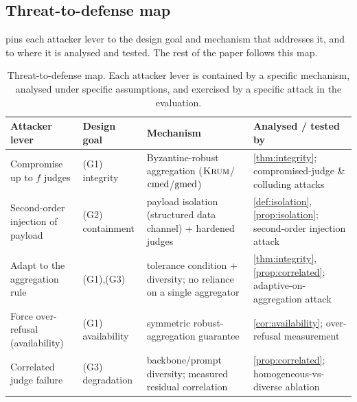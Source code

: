 \subsection{Threat-to-defense map}
 pins each attacker lever to the design goal and mechanism that
addresses it, and to where it is analysed and tested. The rest of the paper follows this
map.

\begin{table}[t]
\centering
\caption{Threat-to-defense map. Each attacker lever is contained by a specific mechanism,
analysed under specific assumptions, and exercised by a specific attack in the evaluation.}
\label{tab:threatmap}
\small
\begin{tabular}{@{}p{3.0cm}p{2.6cm}p{3.1cm}p{3.4cm}@{}}
\toprule
Attacker lever & Design goal & Mechanism & Analysed / tested by \\
\midrule
Compromise up to $f$ judges & (G1) integrity & Byzantine-robust aggregation
  ($\textsc{Krum}$/$\operatorname{cmed}$/$\operatorname{gmed}$) & \cref{thm:integrity}; compromised-judge \& colluding attacks \\
Second-order injection of payload & (G2) containment & payload isolation (structured
  data channel) + hardened judges & \cref{def:isolation}, \cref{prop:isolation};
  second-order injection attack \\
Adapt to the aggregation rule & (G1),(G3) & tolerance condition + diversity;
  no reliance on a single aggregator & \cref{thm:integrity}, \cref{prop:correlated};
  adaptive-on-aggregation attack \\
Force over-refusal (availability) & (G1) availability & symmetric robust-aggregation
  guarantee & \cref{cor:availability}; over-refusal measurement \\
Correlated judge failure & (G3) degradation & backbone/prompt diversity; measured
  residual correlation & \cref{prop:correlated}; homogeneous-vs-diverse ablation \\
\bottomrule
\end{tabular}
\end{table}
